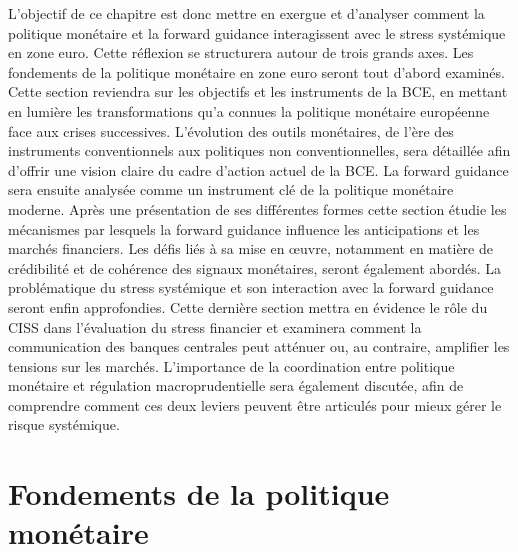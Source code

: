L’objectif de ce chapitre est donc mettre en exergue et d’analyser comment la politique monétaire et la forward guidance interagissent avec le stress systémique en zone euro. Cette réflexion se structurera autour de trois grands axes. Les fondements de la politique monétaire en zone euro seront tout d’abord examinés. Cette section reviendra sur les objectifs et les instruments de la BCE, en mettant en lumière les transformations qu’a connues la politique monétaire européenne face aux crises successives. L’évolution des outils monétaires, de l’ère des instruments conventionnels aux politiques non conventionnelles, sera détaillée afin d’offrir une vision claire du cadre d’action actuel de la BCE. La forward guidance sera ensuite analysée comme un instrument clé de la politique monétaire moderne. Après une présentation de ses différentes formes cette section étudie les mécanismes par lesquels la forward guidance influence les anticipations et les marchés financiers. Les défis liés à sa mise en œuvre, notamment en matière de crédibilité et de cohérence des signaux monétaires, seront également abordés. La problématique du stress systémique et son interaction avec la forward guidance seront enfin approfondies. Cette dernière section mettra en évidence le rôle du CISS dans l’évaluation du stress financier et examinera comment la communication des banques centrales peut atténuer ou, au contraire, amplifier les tensions sur les marchés. L’importance de la coordination entre politique monétaire et régulation macroprudentielle sera également discutée, afin de comprendre comment ces deux leviers peuvent être articulés pour mieux gérer le risque systémique.

\section{Fondements de la politique monétaire}

